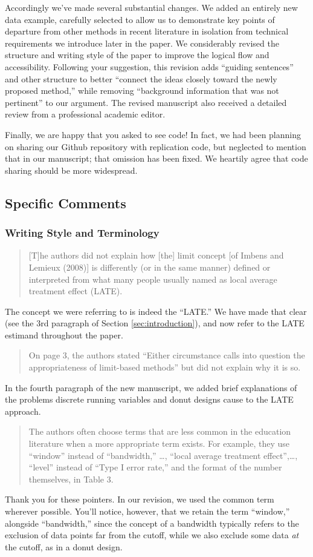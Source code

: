 \documentclass[12pt]{article}
\begin{document}
Accordingly we've made several substantial changes. We added an
entirely new data example, carefully selected to allow us to
demonstrate key points of departure from other methods in recent
literature in isolation from technical requirements we introduce later
in the paper. We
considerably revised the structure and writing style of the paper
to improve the logical flow and accessibility. Following your suggestion, this revision adds 
``guiding sentences'' and other structure to
better ``connect the ideas closely toward the newly proposed method,''
while removing ``background information that was not pertinent'' to our
argument. The revised manuscript also received a detailed review from
a professional academic editor. 

Finally, we are happy that you asked to see code! In fact, we had been
planning on sharing our Github repository with replication code, but
neglected to mention that in our manuscript; that omission has been
fixed. We heartily agree that code sharing should be more widespread.

\subsection{Specific Comments}
\subsubsection{Writing Style and Terminology}
\begin{quote}
[T]he authors did not explain how [the] limit concept [of Imbens and
Lemieux (2008)] is differently (or in the same manner) defined or
interpreted from what many people usually named as local average
treatment effect (LATE).
\end{quote}
The concept we were referring to is indeed the ``LATE.'' We have made
that clear (see the 3rd paragraph of Section \ref{sec:introduction}), and now refer to the
LATE estimand throughout the paper.

\begin{quote}
On page 3, the authors stated “Either circumstance calls into question
the appropriateness of limit-based methods” but did not explain why it
is so.
\end{quote}
In the fourth paragraph of the new manuscript, we added brief
explanations of the problems discrete running variables and donut
designs cause to the LATE approach.




\begin{quote}
The authors often choose terms that are less common in the education
literature when a more appropriate term exists. For example, they use
“window” instead of “bandwidth,” \dots, “local average treatment
effect”,\dots, “level” instead of “Type I error
rate,” and the format of the number themselves, in Table 3.
\end{quote}
Thank you for these pointers. In our revision, we used the common term
wherever possible. You'll notice, however, that we retain the term
``window,'' alongside ``bandwidth,'' since the concept of a bandwidth
typically refers to the exclusion of data points far from the cutoff,
while we also exclude some data \emph{at} the cutoff, as in a donut
design.
\end{document}
